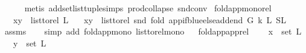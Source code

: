 \begin{isabellebody}
\ \ \ \ \isamarkupfalse%
\ {\isacharparenleft}{\kern0pt}metis\ add{\isacharunderscore}{\kern0pt}set{\isacharunderscore}{\kern0pt}list{\isacharunderscore}{\kern0pt}tuple{\isachardot}{\kern0pt}simps\ prod{\isachardot}{\kern0pt}collapse\ snd{\isacharunderscore}{\kern0pt}conv{\isacharparenright}{\kern0pt}\isanewline
{}\isamarkupfalse%
%
\endisatagproof
{\isafoldproof}%
%
\isadelimproof
\isanewline
%
\endisadelimproof
\isanewline
{}\isamarkupfalse%
\ fold{\isacharunderscore}{\kern0pt}app{\isacharunderscore}{\kern0pt}mono{\isacharunderscore}{\kern0pt}rel{}{\isacharcolon}{\kern0pt}\ \isanewline
\ \ \ {\isachardoublequoteopen}{\isacharparenleft}{\kern0pt}x{\isacharcomma}{\kern0pt}y{\isacharparenright}{\kern0pt}\ {\isasymin}\ list{\isacharunderscore}{\kern0pt}to{\isacharunderscore}{\kern0pt}rel\ L{}{\isachardoublequoteclose}\isanewline
\ \ \ {\isachardoublequoteopen}{\isacharparenleft}{\kern0pt}x{\isacharcomma}{\kern0pt}y{\isacharparenright}{\kern0pt}\ {\isasymin}\ list{\isacharunderscore}{\kern0pt}to{\isacharunderscore}{\kern0pt}rel\ {\isacharparenleft}{\kern0pt}snd\ {\isacharparenleft}{\kern0pt}fold\ {\isacharparenleft}{\kern0pt}app{\isacharunderscore}{\kern0pt}if{\isacharunderscore}{\kern0pt}blue{\isacharunderscore}{\kern0pt}else{\isacharunderscore}{\kern0pt}add{\isacharunderscore}{\kern0pt}end\ G\ k{\isacharparenright}{\kern0pt}\ L{}\ {\isacharparenleft}{\kern0pt}S{\isacharcomma}{\kern0pt}L{}{\isacharparenright}{\kern0pt}{\isacharparenright}{\kern0pt}{\isacharparenright}{\kern0pt}{\isachardoublequoteclose}\ \isanewline
%
\isadelimproof
\ \ %
\endisadelimproof
%
\isatagproof
{}\isamarkupfalse%
\ assms\isanewline
\ \ \isamarkupfalse%
\ {\isacharparenleft}{\kern0pt}simp\ add{\isacharcolon}{\kern0pt}\ fold{\isacharunderscore}{\kern0pt}app{\isacharunderscore}{\kern0pt}mono\ list{\isacharunderscore}{\kern0pt}to{\isacharunderscore}{\kern0pt}rel{\isacharunderscore}{\kern0pt}mono{}{\isacharparenright}{\kern0pt}%
\endisatagproof
{\isafoldproof}%
%
\isadelimproof
\ \isanewline
%
\endisadelimproof
\isanewline
{}\isamarkupfalse%
\ fold{\isacharunderscore}{\kern0pt}app{\isacharunderscore}{\kern0pt}app{\isacharunderscore}{\kern0pt}rel{\isacharcolon}{\kern0pt}\ \isanewline
\ \ \ {\isachardoublequoteopen}x\ {\isasymin}\ set\ L{}{\isachardoublequoteclose}\isanewline
\ \ \ {\isachardoublequoteopen}y\ {\isasymin}\ set\ L{}{\isachardoublequoteclose}\isanewline

\end{isabellebody}
